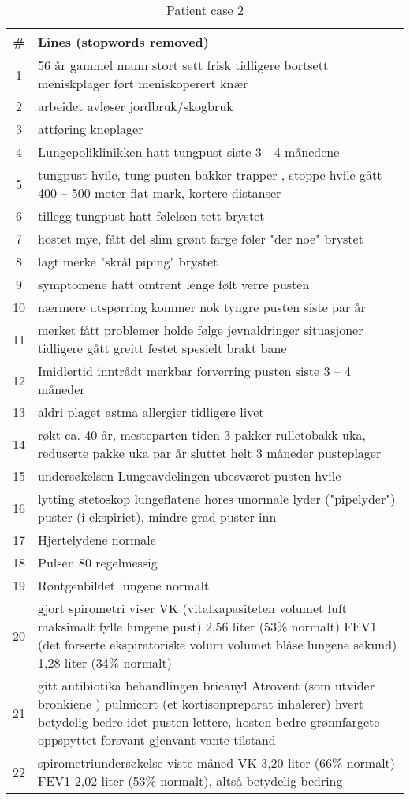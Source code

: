 \begin{table}[htbp] \footnotesize \center
\caption{Patient case 2\label{tab:case2}}
\begin{tabularx}{\textwidth}{c X}
    \toprule
    \# & Lines (stopwords removed) \\
    \midrule
    1 & 56 år gammel mann stort sett frisk tidligere bortsett meniskplager ført meniskoperert knær \\
    2 & arbeidet avløser jordbruk/skogbruk \\
    3 & attføring kneplager \\
    4 & Lungepoliklinikken hatt tungpust siste 3 - 4 månedene \\
    5 & tungpust hvile, tung pusten bakker trapper , stoppe hvile gått 400 -- 500 meter flat mark, kortere distanser \\
    6 & tillegg tungpust hatt følelsen tett brystet \\
    7 & hostet mye, fått del slim grønt farge føler "der noe" brystet \\
    8 & lagt merke "skrål piping" brystet \\
    9 & symptomene hatt omtrent lenge følt verre pusten \\
    10 & nærmere utspørring kommer nok tyngre pusten siste par år \\
    11 & merket fått problemer holde følge jevnaldringer situasjoner tidligere gått greitt festet spesielt brakt bane \\
    12 & Imidlertid inntrådt merkbar forverring pusten siste 3 -- 4 måneder \\
    13 & aldri plaget astma allergier tidligere livet \\
    14 & røkt ca. 40 år, mesteparten tiden 3 pakker rulletobakk uka, reduserte pakke uka par år sluttet helt 3 måneder pusteplager \\
    15 & undersøkelsen Lungeavdelingen ubesværet pusten hvile \\
    16 & lytting stetoskop lungeflatene høres unormale lyder ("pipelyder") puster (i ekspiriet), mindre grad puster inn \\
    17 & Hjertelydene normale \\
    18 & Pulsen 80 regelmessig \\
    19 & Røntgenbildet lungene normalt \\
    20 & gjort spirometri viser VK (vitalkapasiteten volumet luft maksimalt fylle lungene pust) 2,56 liter (53\% normalt) FEV1 (det forserte ekspiratoriske volum volumet blåse lungene sekund) 1,28 liter (34\% normalt) \\
    21 & gitt antibiotika behandlingen bricanyl Atrovent (som utvider bronkiene ) pulmicort (et kortisonpreparat inhalerer) hvert betydelig bedre idet pusten lettere, hosten bedre grønnfargete oppspyttet forsvant gjenvant vante tilstand \\
    22 & spirometriundersøkelse viste måned VK 3,20 liter (66\% normalt) FEV1 2,02 liter (53\% normalt), altså betydelig bedring \\
    \bottomrule
\end{tabularx}
\end{table}

